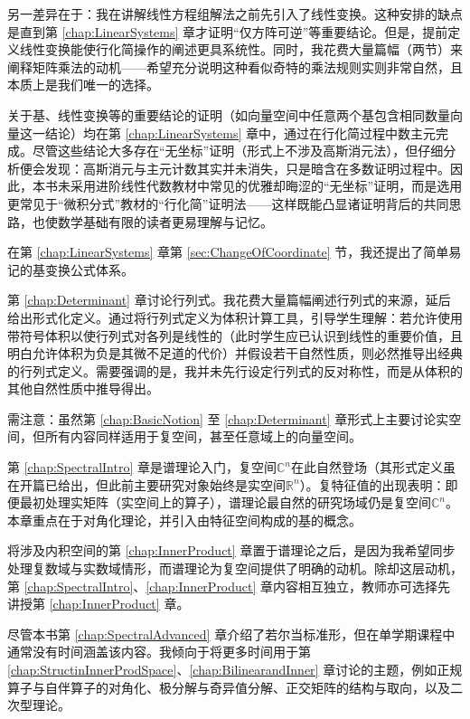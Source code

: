 \begin{preface}
另一差异在于：我在讲解线性方程组解法之前先引入了线性变换。这种安排的缺点是直到第 \ref{chap:LinearSystems} 章才证明“仅方阵可逆”等重要结论。但是，提前定义线性变换能使行化简操作的阐述更具系统性。同时，我花费大量篇幅（两节）来阐释矩阵乘法的动机——希望充分说明这种看似奇特的乘法规则实则非常自然，且本质上是我们唯一的选择。

关于基、线性变换等的重要结论的证明（如向量空间中任意两个基包含相同数量向量这一结论）均在第 \ref{chap:LinearSystems} 章中，通过在行化简过程中数主元完成。尽管这些结论大多存在“无坐标”证明（形式上不涉及高斯消元法），但仔细分析便会发现：高斯消元与主元计数其实并未消失，只是暗含在多数证明过程中。因此，本书未采用进阶线性代数教材中常见的优雅却晦涩的“无坐标”证明，而是选用更常见于“微积分式”教材的“行化简”证明法——这样既能凸显诸证明背后的共同思路，也使数学基础有限的读者更易理解与记忆。

在第 \ref{chap:LinearSystems} 章第 \ref{sec:ChangeOfCoordinate} 节，我还提出了简单易记的基变换公式体系。

第 \ref{chap:Determinant} 章讨论行列式。我花费大量篇幅阐述行列式的来源，延后给出形式化定义。通过将行列式定义为体积计算工具，引导学生理解：若允许使用带符号体积以使行列式对各列是线性的（此时学生应已认识到线性的重要价值，且明白允许体积为负是其微不足道的代价）并假设若干自然性质，则必然推导出经典的行列式定义。需要强调的是，我并未先行设定行列式的反对称性，而是从体积的其他自然性质中推导得出。

需注意：虽然第 \ref{chap:BasicNotion} 至 \ref{chap:Determinant} 章形式上主要讨论实空间，但所有内容同样适用于复空间，甚至任意域上的向量空间。

第 \ref{chap:SpectralIntro} 章是谱理论入门，复空间$\mathbb{C}^n$在此自然登场（其形式定义虽在开篇已给出，但此前主要研究对象始终是实空间$\mathbb{R}^n$）。复特征值的出现表明：即便最初处理实矩阵（实空间上的算子），谱理论最自然的研究场域仍是复空间$\mathbb{C}^n$。本章重点在于对角化理论，并引入由特征空间构成的基的概念。

将涉及内积空间的第 \ref{chap:InnerProduct} 章置于谱理论之后，是因为我希望同步处理复数域与实数域情形，而谱理论为复空间提供了明确的动机。除却这层动机，第 \ref{chap:SpectralIntro}、\ref{chap:InnerProduct} 章内容相互独立，教师亦可选择先讲授第 \ref{chap:InnerProduct} 章。

尽管本书第 \ref{chap:SpectralAdvanced} 章介绍了若尔当标准形，但在单学期课程中通常没有时间涵盖该内容。我倾向于将更多时间用于第 \ref{chap:StructinInnerProdSpace}、\ref{chap:BilinearandInner} 章讨论的主题，例如正规算子与自伴算子的对角化、极分解与奇异值分解、正交矩阵的结构与取向，以及二次型理论。


\end{preface}
